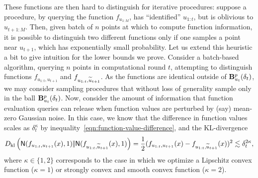 These functions are then hard to distinguish for iterative procedures:
suppose a procedure, by querying the function $f_{u_{1:M}}$, has
``identified'' $u_{1:t}$, but is oblivious to $u_{t+1:M}$. Then, given batch
of $n$ points at which to compute function information, it is possible to
distinguish two different functions only if one samples a point near
$u_{t+1}$, which has exponentially small probability.  Let us extend this
heuristic a bit to give intuition for the lower bounds we prove. Consider a
batch-based algorithm, querying $n$ points in computational round $t$,
attempting to distinguish functions $f_{u_{1:t},u_{t+1}}$ and
$f_{u_{1:t},\widetilde{u}_{t+1}}$. As the functions are identical outside of
$\mathbf{B}^p_{u_t}({\delta_t})$, we may consider sampling procedures that without
loss of generality sample only in the ball $\mathbf{B}^p_{u_t}({\delta_t})$.  Now,
consider the amount of information that function evaluation queries can
release when function values are perturbed by (say) mean-zero Gaussian
noise.  In this case, we know that the difference in function values scales
as $\delta_t^\kappa$ by inequality~\eqref{eqn:function-value-difference},
and the KL-divergence
\begin{equation}
  \label{eqn:kl-heuristic}
  \dkl{\normal(f_{u_{1:t},u_{t+1}}(x), 1)}{
    \normal(f_{u_{1:t},\wt{u}_{t+1}}(x), 1)}
  = \half (f_{u_{1:t},u_{t+1}}(x) - 
  f_{u_{1:t},\wt{u}_{t+1}}(x))^2 \lesssim \delta_t^{2\kappa},
\end{equation}
where $\kappa \in \{1, 2\}$ corresponds to the case in which we optimize a
Lipschitz convex function ($\kappa = 1$) or strongly convex and smooth convex
function ($\kappa = 2$). 

